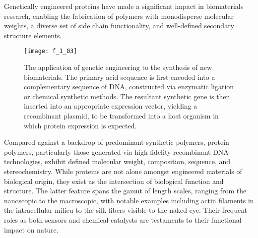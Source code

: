 \begin{refsection}
Genetically engineered proteins have made a significant impact in biomaterials
research, enabling the fabrication of polymers with monodisperse molecular
weights, a diverse set of side chain functionality, and well-defined secondary
structure elements.\cite{
Yoshikawa1994,Wang2001,Rabotyagova2009,Martin2009,Dinerman2002,Megeed2002,Haider2004,Wright2002,Banta2010,Link2003,Straley2009,Rabotyagova2011}
\begin{figure}[h!] \centering \texttt{[image: f\_1\_03]}
    \caption[The application of genetic engineering to the synthesis of new
            biomaterials. The primary acid sequence is first encoded into a
            complementary sequence of DNA, constructed via enzymatic ligation or
            chemical synthetic methods. The resultant synthetic gene is then
            inserted into an appropriate expression vector, yielding a
            recombinant plasmid, to be transformed into a host organism in which
            protein expression is
            expected.]
        {The application of genetic engineering to the synthesis of new
            biomaterials. The primary acid sequence is first encoded into a
            complementary sequence of DNA, constructed via enzymatic ligation or
            chemical synthetic methods. The resultant synthetic gene is then
            inserted into an appropriate expression vector, yielding a
            recombinant plasmid, to be transformed into a host organism in which
            protein expression is
            expected.\cite{Tirrell1991}}\label{fig:protein_engineering_methods}
        \end{figure}
Compared against a backdrop of predominant synthetic polymers, protein polymers,
particularly those generated via high-fidelity recombinant DNA technologies,
exhibit defined molecular weight, composition, sequence, and
stereochemistry.\cite{VanHest2001} While proteins are not alone amongst
engineered materials of biological origin, they exist as the intersection of
biological function and structure. The latter feature spans the gamut of length
scales, ranging from the nanoscopic to the macroscopic, with notable examples
including actin filaments in the intracellular milieu to the silk fibers visible
to the naked eye.\cite{Rabotyagova2009,Megeed2002,Nagarsekar2002} Their frequent
roles as both sensors and chemical catalysts are testaments to their functional
impact on nature.



\end{refsection}

